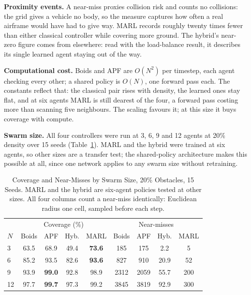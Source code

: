 \documentclass[a4paper, 10pt, conference]{ieeeconf}
\begin{document}
\textbf{Proximity events.} A near-miss proxies collision risk and
counts no collisions: the grid gives a vehicle no body, so the measure
captures how often a real airframe would have had to give way. MARL
records roughly twenty times fewer than either classical controller
while covering more ground. The hybrid's near-zero figure comes from
elsewhere: read with the load-balance result, it describes its single
learned agent staying out of the way.

\textbf{Computational cost.} Boids and APF are $O(N^2)$ per timestep,
each agent checking every other; a shared policy is $O(N)$, one
forward pass each. The constants reflect that: the classical pair
rises with density, the learned ones stay flat, and at six agents MARL
is still dearest of the four, a forward pass costing more than
scanning five neighbours. The scaling favours it; at this size it buys
coverage with compute.

\textbf{Swarm size.} All four controllers were run at 3, 6, 9 and 12
agents at 20\% density over 15 seeds (Table~\ref{tab:swarm}). MARL and
the hybrid were trained at six agents, so other sizes are a transfer
test; the shared-policy architecture makes this possible at all, since
one network applies to any swarm size without retraining.

\begin{table}[htb]
\centering
\caption{Coverage and Near-Misses by Swarm Size, 20\% Obstacles,
15 Seeds. MARL and the hybrid are six-agent policies tested at other
sizes. All four columns count a near-miss identically: Euclidean
radius one cell, sampled before each step.}
\label{tab:swarm}
\scriptsize
\setlength{\tabcolsep}{3pt}
\begin{tabular}{lcccc|cccc}
\toprule
& \multicolumn{4}{c|}{Coverage (\%)} & \multicolumn{4}{c}{Near-misses} \\
$N$ & Boids & APF & Hyb. & MARL & Boids & APF & Hyb. & MARL \\
\midrule
3  & 63.5 & 68.9 & 49.4 & \textbf{73.6} & 185  & 175  & 2.2  & 5    \\
6  & 85.2 & 93.5 & 82.6 & \textbf{93.6} & 827  & 910  & 20.9 & 52   \\
9  & 93.9 & \textbf{99.0} & 92.8 & 98.9 & 2312 & 2059 & 55.7 & 200  \\
12 & 97.7 & \textbf{99.7} & 97.3 & 99.2 & 3845 & 3819 & 92.9 & 300  \\
\bottomrule
\end{tabular}
\end{table}
\end{document}
